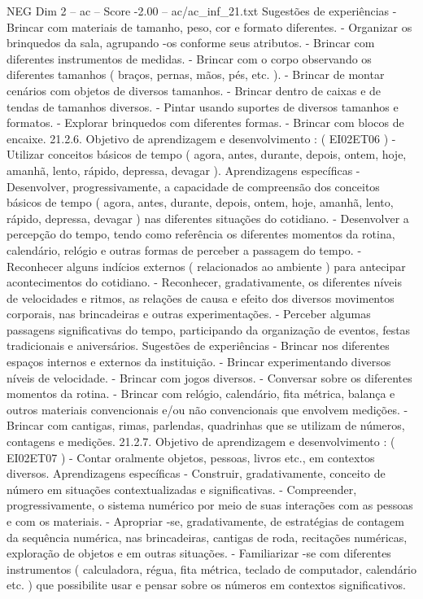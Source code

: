 \begin{textsample}{NEG Dim 2 – ac – Score -2.00 – ac/ac\_inf\_21.txt}
Sugestões de experiências - Brincar com materiais de tamanho, peso, cor e formato diferentes. - Organizar os brinquedos da sala, agrupando -os conforme seus atributos. - Brincar com diferentes instrumentos de medidas. - Brincar com o corpo observando os diferentes tamanhos ( braços, pernas, mãos, pés, etc. ). - Brincar de montar cenários com objetos de diversos tamanhos. - Brincar dentro de caixas e de tendas de tamanhos diversos. - Pintar usando suportes de diversos tamanhos e formatos. - Explorar brinquedos com diferentes formas. - Brincar com blocos de encaixe. 21.2.6.
Objetivo de aprendizagem e desenvolvimento : ( EI02ET06 ) - Utilizar conceitos básicos de tempo ( agora, antes, durante, depois, ontem, hoje, amanhã, lento, rápido, depressa, devagar ).
Aprendizagens específicas - Desenvolver, progressivamente, a capacidade de compreensão dos conceitos básicos de tempo ( agora, antes, durante, depois, ontem, hoje, amanhã, lento, rápido, depressa, devagar ) nas diferentes situações do cotidiano. - Desenvolver a percepção do tempo, tendo como referência os diferentes momentos da rotina, calendário, relógio e outras formas de perceber a passagem do tempo. - Reconhecer alguns indícios externos ( relacionados ao ambiente ) para antecipar acontecimentos do cotidiano. - Reconhecer, gradativamente, os diferentes níveis de velocidades e ritmos, as relações de causa e efeito dos diversos movimentos corporais, nas brincadeiras e outras experimentações. - Perceber algumas passagens significativas do tempo, participando da organização de eventos, festas tradicionais e aniversários.
Sugestões de experiências - Brincar nos diferentes espaços internos e externos da instituição. - Brincar experimentando diversos níveis de velocidade. - Brincar com jogos diversos. - Conversar sobre os diferentes momentos da rotina. - Brincar com relógio, calendário, fita métrica, balança e outros materiais convencionais e/ou não convencionais que envolvem medições. - Brincar com cantigas, rimas, parlendas, quadrinhas que se utilizam de números, contagens e medições. 21.2.7.
Objetivo de aprendizagem e desenvolvimento : ( EI02ET07 ) - Contar oralmente objetos, pessoas, livros etc., em contextos diversos.
Aprendizagens específicas - Construir, gradativamente, conceito de número em situações contextualizadas e significativas. - Compreender, progressivamente, o sistema numérico por meio de suas interações com as pessoas e com os materiais. - Apropriar -se, gradativamente, de estratégias de contagem da sequência numérica, nas brincadeiras, cantigas de roda, recitações numéricas, exploração de objetos e em outras situações. - Familiarizar -se com diferentes instrumentos ( calculadora, régua, fita métrica, teclado de computador, calendário etc. ) que possibilite usar e pensar sobre os números em contextos significativos.

\end{textsample}

